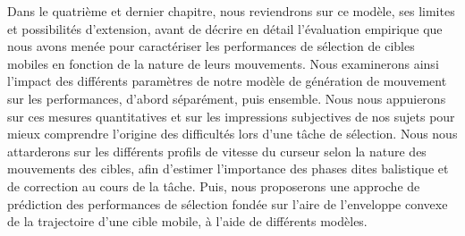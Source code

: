 	Dans le quatrième et dernier chapitre, nous reviendrons sur ce modèle, ses limites et possibilités d'extension, avant de décrire en détail l'évaluation empirique que nous avons menée pour caractériser les performances de sélection de cibles mobiles en fonction de la nature de leurs mouvements. Nous examinerons ainsi l'impact des différents paramètres de notre modèle de génération de mouvement sur les performances, d'abord séparément, puis ensemble. Nous nous appuierons sur ces mesures quantitatives et sur les impressions subjectives de nos sujets pour mieux comprendre l'origine des difficultés lors d'une tâche de sélection. Nous nous attarderons sur les différents profils de vitesse du curseur selon la nature des mouvements des cibles, afin d'estimer l'importance des phases dites balistique et de correction au cours de la tâche. Puis, nous proposerons une approche de prédiction des performances de sélection fondée sur l'aire de l'enveloppe convexe de la trajectoire d'une cible mobile, à l'aide de différents modèles.